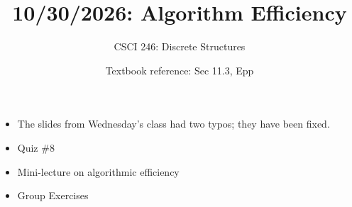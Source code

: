 \documentclass[10pt]{beamer}
\begin{document}




\title{10/30/2026: Algorithm Efficiency}
\author{CSCI 246: Discrete Structures}
\date{Textbook reference: Sec 11.3, Epp}

\begin{frame}
    \titlepage 
\end{frame}


\begin{frame}
\begin{myredbox}[title=Announcements]
\begin{itemize}
	\item The slides from Wednesday's class had two typos; they have been fixed.
\end{itemize}
\end{myredbox}

\vfill 
\begin{myyellowbox}[title=Today's Agenda]
\begin{itemize}
\item Quiz \#8 
\item Mini-lecture on algorithmic efficiency 
\item Group Exercises
\end{itemize}

\end{myyellowbox}
\vfill 

\end{frame}
\end{document}
